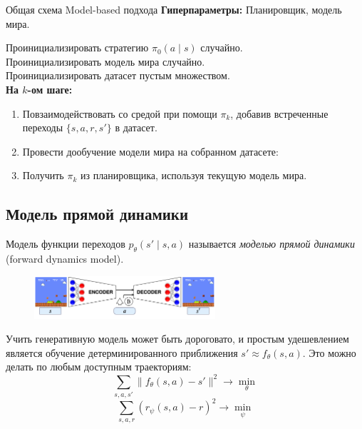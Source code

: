 \begin{algorithm}{Общая схема Model-based подхода}
\textbf{Гиперпараметры:} Планировщик, модель мира.

\vspace{0.3cm}
Проинициализировать стратегию $\pi_0(a \mid s)$ случайно. \\
Проинициализировать модель мира случайно. \\
Проинициализировать датасет пустым множеством. \\
\textbf{На $k$-ом шаге:}
\begin{enumerate}
    \item Повзаимодействовать со средой при помощи $\pi_k$, добавив встреченные переходы $\{s, a, r, s'\}$ в датасет.
    \item Провести дообучение модели мира на собранном датасете:
    \item Получить $\pi_k$ из планировщика, используя текущую модель мира.
\end{enumerate}
\end{algorithm}

\subsection{Модель прямой динамики}

\begin{definition}
Модель функции переходов $p_\theta(s' \mid s, a)$ называется \emph{моделью прямой динамики} (forward dynamics model).
\end{definition}

\begin{figure}
\vspace{-0.5cm}
\centering
\includegraphics[width=0.6\textwidth]{Images/MarioVAE.png}
\vspace{-0.5cm}
\end{figure}

Учить генеративную модель может быть дороговато, и простым удешевлением является обучение детерминированного приближения $s' \approx f_\theta(s, a)$. Это можно делать по любым доступным траекториям:
$$\sum_{s, a, s'} \|f_\theta(s, a) - s'\|^2 \to \min_\theta$$
$$\sum_{s, a, r} \left( r_\psi(s, a) - r \right)^2 \to \min_\psi$$

